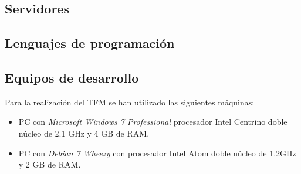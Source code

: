 \subsection{Servidores}
\subsection{Lenguajes de programación}
\subsection{Equipos de desarrollo}

Para la realización del \acs{TFM} se han utilizado las siguientes máquinas: 

\begin{itemize}
\item PC con \textit{Microsoft Windows 7 Professional} procesador Intel Centrino
  doble núcleo de 2.1 GHz y 4 GB de RAM. 
\item PC con \textit{Debian 7 Wheezy} con procesador Intel Atom doble núcleo de
  1.2GHz y 2 GB de RAM. 
\end{itemize}
